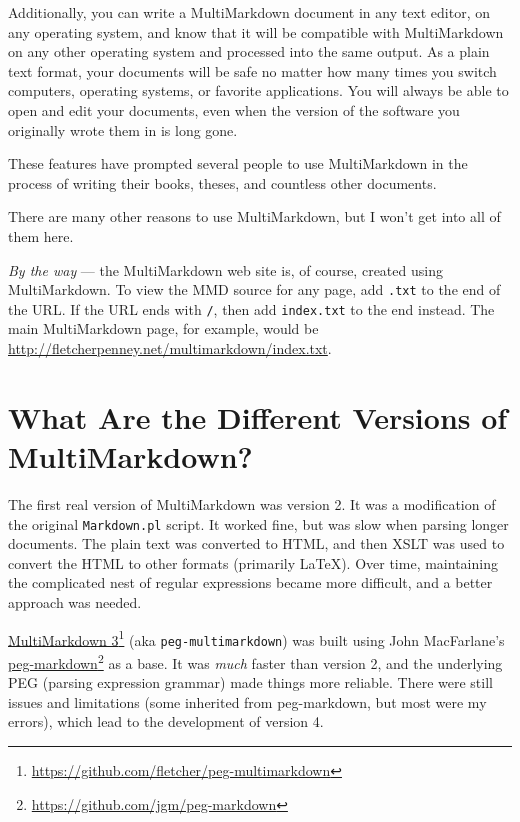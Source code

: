 Additionally, you can write a MultiMarkdown document in any text editor, on any operating system, and know that it will be compatible with MultiMarkdown on any other operating system and processed into the same output. As a plain text format, your documents will be safe no matter how many times you switch computers, operating systems, or favorite applications. You will always be able to open and edit your documents, even when the version of the software you originally wrote them in is long gone.

These features have prompted several people to use MultiMarkdown in the process of writing their books, theses, and countless other documents.

There are many other reasons to use MultiMarkdown, but I won't get into all of them here.

\emph{By the way} --- the MultiMarkdown web site is, of course, created using MultiMarkdown. To view the \gls{MMD} source for any page, add \texttt{.txt} to the end of the URL. If the URL ends with \texttt{\slash{}}, then add \texttt{index.txt} to the end instead. The main MultiMarkdown page, for example, would be \href{http://fletcherpenney.net/multimarkdown/index.txt}{http:\slash{}\slash{}fletcherpenney.net\slash{}multimarkdown\slash{}index.txt}.

\section{What Are the Different Versions of MultiMarkdown?}
\label{whatarethedifferentversionsofmultimarkdown}

The first real version of MultiMarkdown was version 2. It was a modification of the original \texttt{Markdown.pl} script. It worked fine, but was slow when parsing longer documents. The plain text was converted to HTML, and then XSLT was used to convert the HTML to other formats (primarily LaTeX). Over time, maintaining the complicated nest of regular expressions became more difficult, and a better approach was needed.

\href{https://github.com/fletcher/peg-multimarkdown}{MultiMarkdown 3}\footnote{\href{https://github.com/fletcher/peg-multimarkdown}{https:\slash{}\slash{}github.com\slash{}fletcher\slash{}peg-multimarkdown}} (aka \texttt{peg-multimarkdown}) was built using John MacFarlane's \href{https://github.com/jgm/peg-markdown}{peg-markdown}\footnote{\href{https://github.com/jgm/peg-markdown}{https:\slash{}\slash{}github.com\slash{}jgm\slash{}peg-markdown}} as a base. It was \emph{much} faster than version 2, and the underlying PEG (parsing expression grammar) made things more reliable. There were still issues and limitations (some inherited from peg-markdown, but most were my errors), which lead to the development of version 4.

